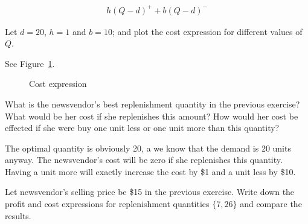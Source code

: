 \begin{solution}
\begin{align*}
h(Q-d)^+ + b(Q-d)^-
\end{align*}
\end{solution}

\begin{question}\label{ex:nw_det}
Let $d=20$, $h=1$ and $b=10$; and plot the cost expression for different values of $Q$. 
\end{question}

\begin{solution}
See Figure~\ref{fig:cost_expression}.

\begin{figure}[htbp]
\centering
{}
\caption{Cost expression}
\label{fig:cost_expression}
\end{figure}
\end{solution}

\begin{question}
What is the newsvendor's best replenishment quantity in the previous exercise? What would be her cost if she replenishes this amount? How would her cost be effected if she were buy one unit less or one unit more than this quantity?
\end{question}

\begin{solution}
The optimal quantity is obviously 20, a we know that the demand is 20 units anyway. The newsvendor's cost will be zero if she replenishes this quantity. Having a unit more will exactly increase the cost by \$1 and a unit less by \$10.
\end{solution}

\begin{question}
Let newsvendor's selling price be \$15 in the previous exercise. Write down the profit and cost expressions for replenishment quantities $\{7,26\}$ and compare the results.
\end{question}

